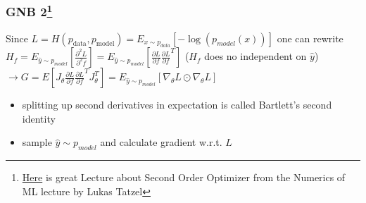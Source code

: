 \documentclass[
	11pt, %
	aspectratio=169, %
]{beamer}
\begin{document}
\begin{frame}
	\frametitle{GNB 2\footnote{\href{https://youtu.be/416NjW3QfwA?feature=shared}{Here} is great Lecture about Second Order Optimizer from the Numerics of ML lecture by Lukas Tatzel}}
	Since $L=H(p_{\text{data}}, p_{\text{model}}) = E_{x\sim p_{data}}[-\log(p_{model}(x))]$ one can rewrite  $H_f = E_{\hat{y} \sim p_{model}}[\frac{\partial^2 L }{\partial^2 f }] =E_{\hat{y} \sim p_{model}}[\frac{\partial L }{\partial f }\frac{\partial L }{\partial f }^T] $ ($H_f$ does no independent on $\hat{y}$)\\
	$\rightarrow G = E[J_\theta \frac{\partial L }{\partial f }\frac{\partial L }{\partial f }^T J_\theta^T] = E_{\hat{y} \sim p_{model}}[\nabla_\theta L \odot \nabla_\theta L] $
	\begin{itemize}
		\item splitting up second derivatives in expectation is called Bartlett's second identity 
		\item sample $\hat{y} \sim p_{model}$ and calculate gradient w.r.t. $L$
	\end{itemize}

	
\end{frame}
\end{document}
